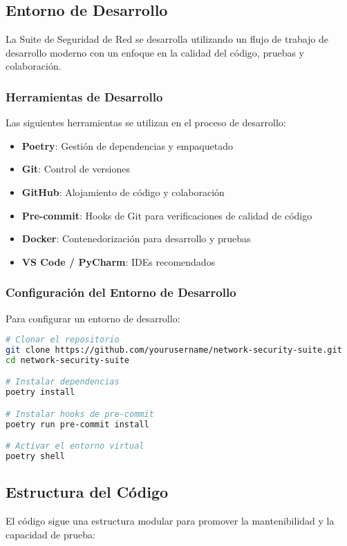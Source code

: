 \subsection{Entorno de Desarrollo}
La Suite de Seguridad de Red se desarrolla utilizando un flujo de trabajo de desarrollo moderno con un enfoque en la calidad del código, pruebas y colaboración.

\subsubsection{Herramientas de Desarrollo}
Las siguientes herramientas se utilizan en el proceso de desarrollo:

\begin{itemize}
    \item \textbf{Poetry}: Gestión de dependencias y empaquetado
    \item \textbf{Git}: Control de versiones
    \item \textbf{GitHub}: Alojamiento de código y colaboración
    \item \textbf{Pre-commit}: Hooks de Git para verificaciones de calidad de código
    \item \textbf{Docker}: Contenedorización para desarrollo y pruebas
    \item \textbf{VS Code / PyCharm}: IDEs recomendados
\end{itemize}

\subsubsection{Configuración del Entorno de Desarrollo}
Para configurar un entorno de desarrollo:

\begin{lstlisting}[language=bash, caption=Configuración del Entorno de Desarrollo]
# Clonar el repositorio
git clone https://github.com/yourusername/network-security-suite.git
cd network-security-suite

# Instalar dependencias
poetry install

# Instalar hooks de pre-commit
poetry run pre-commit install

# Activar el entorno virtual
poetry shell
\end{lstlisting}

\subsection{Estructura del Código}
El código sigue una estructura modular para promover la mantenibilidad y la capacidad de prueba:

